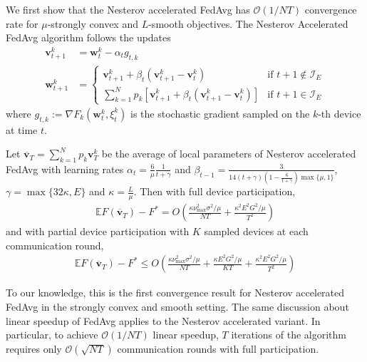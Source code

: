 We first show that the Nesterov accelerated FedAvg has $\mathcal{O}(1/NT)$
convergence rate for $\mu$-strongly convex and $L$-smooth objectives.
The Nesterov Accelerated FedAvg algorithm follows the updates
\begin{align*}
\mathbf{v}_{t+1}^{k} & =\mathbf{w}_{t}^{k}-\alpha_{t}g_{t,k}\\
\mathbf{w}_{t+1}^{k} & =\begin{cases}
\mathbf{v}_{t+1}^{k}+\beta_{t}(\mathbf{v}_{t+1}^{k}-\mathbf{v}_{t}^{k}) & \text{if }t+1\notin\mathcal{I}_{E}\\
\sum_{k=1}^{N}p_{k}\left[\mathbf{v}_{t+1}^{k}+\beta_{t}(\mathbf{v}_{t+1}^{k}-\mathbf{v}_{t}^{k})\right] & \text{if }t+1\in\mathcal{I}_{E}
\end{cases}
\end{align*}
where $g_{t,k}:=\nabla F_{k}(\mathbf{w}_{t}^{k},\xi_{t}^{k})$ is
the stochastic gradient sampled on the $k$-th device at time $t$.  
\begin{theorem}
	Let $\overline{\mathbf{v}}_{T}=\sum_{k=1}^{N}p_{k}\mathbf{v}_{T}^{k}$
	be the average of local parameters of Nesterov accelerated FedAvg
	with learning rates $\alpha_{t}=\frac{6}{\mu}\frac{1}{t+\gamma}$
	and $\beta_{t-1}=\frac{3}{14(t+\gamma)(1-\frac{6}{t+\gamma})\max\{\mu,1\}}$,
	$\gamma=\max\{32\kappa,E\}$ and $\kappa=\frac{L}{\mu}$. Then with
	full device participation, 
	\begin{align*}
	\mathbb{E}F(\overline{\mathbf{v}}_{T})-F^{\ast}=O(\frac{\kappa\nu_{\max}^{2}\sigma^{2}/\mu}{NT}+\frac{\kappa^{2}E^{2}G^{2}/\mu}{T^{2}})
	\end{align*}
	and with partial device participation with $K$ sampled devices at
	each communication round, 
	\begin{align*}
	\mathbb{E}F(\overline{\mathbf{v}}_{T})-F^{\ast}\leq O(\frac{\kappa\nu_{\max}^{2}\sigma^{2}/\mu}{NT}+\frac{\kappa E^{2}G^{2}/\mu}{KT}+\frac{\kappa^{2}E^{2}G^{2}/\mu}{T^{2}})
	\end{align*}
\end{theorem}
%
\begin{remark}
To our knowledge, this is the first convergence result for Nesterov
accelerated FedAvg in the strongly convex and smooth setting. The
same discussion about linear speedup of FedAvg applies to the Nesterov
accelerated variant. In particular, to achieve $\mathcal{O}(1/NT)$
linear speedup, $T$ iterations of the algorithm requires only $\mathcal{O}(\sqrt{NT})$
communication rounds with full participation. 
\end{remark}

